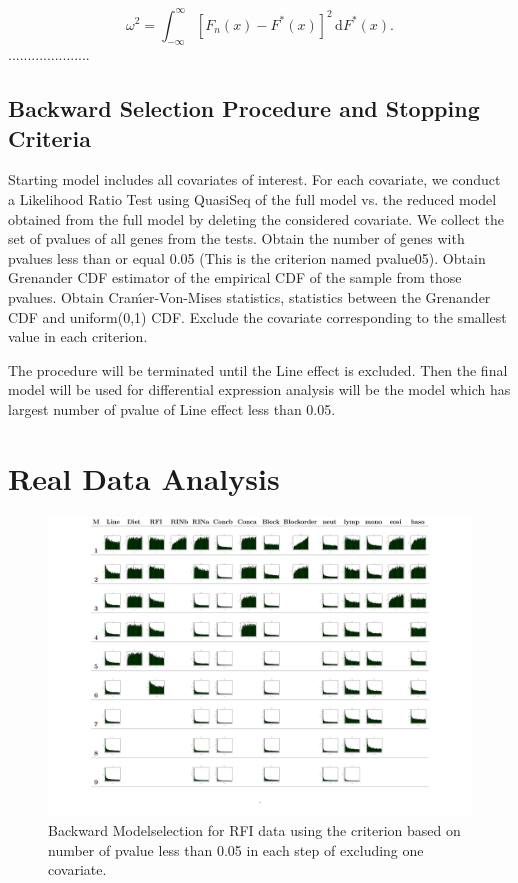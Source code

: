 \documentclass[12pt, letter]{article}\usepackage[]{graphicx}\usepackage[]{color}
\begin{document}
\[
\omega^2 = \int_{-\infty}^{\infty} [F_n(x)-F^*(x)]^2\,\mathrm{d}F^*(x) .
\]
.....................
\subsection{Backward Selection Procedure and Stopping Criteria}

Starting model includes all covariates of interest. For each covariate,
we conduct a Likelihood Ratio Test using QuasiSeq of the full model
vs. the reduced model obtained from the full model by deleting the
considered covariate. We collect the set of pvalues of all genes from
the tests.
Obtain the number of genes with pvalues less than or equal 0.05 (This is the criterion named pvalue05).
Obtain Grenander CDF estimator of the empirical CDF of the sample
from those pvalues.
Obtain Craḿer-Von-Mises statistics,
 statistics between the Grenander CDF and
uniform(0,1) CDF.
Exclude the covariate corresponding to the smallest value in each criterion.

The procedure will be terminated until the Line effect is excluded.  Then the final model will be used for differential expression analysis will be the model which has largest number of pvalue of Line effect less than 0.05.
\section{\bf Real Data Analysis}
\begin{figure}[h!]
\centering
\includegraphics[scale = 0.23]{PlotG9P2PairedEndCBCpvalue05.pdf}
\caption{Backward Modelselection for RFI data using the criterion based on number of pvalue less than 0.05 in each step of excluding one covariate. }
\end{figure}
\end{document}
